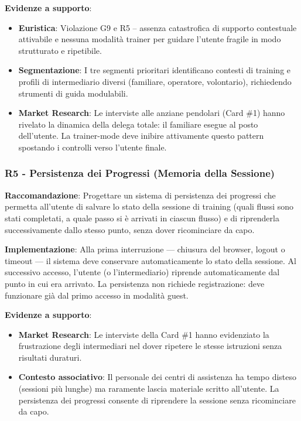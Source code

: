 ﻿\documentclass[11pt,a4paper]{article}
\begin{document}
\textbf{Evidenze a supporto}:
\begin{itemize}
    \item \textbf{Euristica}: Violazione G9 e R5 -- assenza catastrofica di
    supporto contestuale attivabile e nessuna modalit\`a trainer per guidare
    l'utente fragile in modo strutturato e ripetibile.
    \item \textbf{Segmentazione}: I tre segmenti prioritari identificano
    contesti di training e profili di intermediario diversi (familiare,
    operatore, volontario), richiedendo strumenti di guida modulabili.
    \item \textbf{Market Research}: Le interviste alle anziane pendolari
    (Card \#1) hanno rivelato la dinamica della delega totale: il familiare
    esegue al posto dell'utente. La trainer-mode deve inibire attivamente
    questo pattern spostando i controlli verso l'utente finale.
\end{itemize}

\subsubsection{R5 - Persistenza dei Progressi (Memoria della Sessione)}
\label{rec:R5}

\textbf{Raccomandazione}: Progettare un sistema di persistenza dei progressi
che permetta all'utente di salvare lo stato della sessione di training (quali
flussi sono stati completati, a quale passo si \`e arrivati in ciascun flusso)
e di riprenderla successivamente dallo stesso punto, senza dover ricominciare
da capo.

\textbf{Implementazione}: Alla prima interruzione — chiusura del browser,
logout o timeout — il sistema deve conservare automaticamente lo stato della
sessione. Al successivo accesso, l'utente (o l'intermediario) riprende
automaticamente dal punto in cui era arrivato. La persistenza non richiede
registrazione: deve funzionare gi\`a dal primo accesso in modalit\`a guest.

\textbf{Evidenze a supporto}:
\begin{itemize}
    \item \textbf{Market Research}: Le interviste della Card \#1 hanno
    evidenziato la frustrazione degli intermediari nel dover ripetere
    le stesse istruzioni senza risultati duraturi.
    \item \textbf{Contesto associativo}: Il personale dei centri di
    assistenza ha tempo disteso (sessioni pi\`u lunghe) ma raramente lascia
    materiale scritto all'utente. La persistenza dei progressi consente
    di riprendere la sessione senza ricominciare da capo.
\end{itemize}
\end{document}
